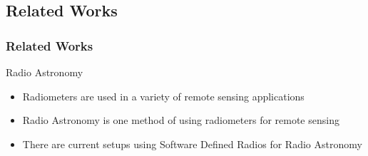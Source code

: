 \documentclass[notes]{beamer}
\begin{document}
\subsection{Related Works}
\begin{frame}
\frametitle{Related Works}
\begin{block}{Radio Astronomy}
\begin{itemize}
\item Radiometers are used in a variety of remote sensing applications
\item Radio Astronomy is one method of using radiometers for remote sensing
\item There are current setups using Software Defined Radios for Radio Astronomy
\end{itemize}
\end{block}
\end{frame}
\end{document}
